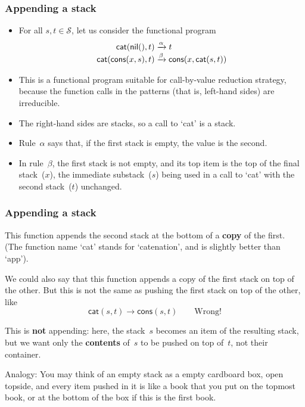 \documentclass[compress,dvipdfmx]{beamer}
\newcommand\fun[1]{\textsf{#1}}
\begin{document}
\begin{frame}
  \frametitle{Appending a stack}

  \begin{itemize}

    \item For all \(s, t \in \mathcal{S}\), let us consider the
      functional program
      \begin{align*}
        \fun{cat}(\fun{nil}(),t) &\xrightarrow{\alpha} t\\
        \fun{cat}(\fun{cons}(x,s),t) &\xrightarrow{\smash\beta}
        \fun{cons}(x,\fun{cat}(s,t))
      \end{align*}

    \item This is a functional program suitable for
      call\hyp{}by\hyp{}value reduction strategy, because the function
      calls in the patterns (that is, left\hyp{}hand sides) are
      irreducible.

    \item The right\hyp{}hand sides are stacks, so a call to
      `\fun{cat}' is a stack.

    \item Rule~\(\alpha\) says that, if the first stack is empty, the
      value is the second.

    \item In rule~\(\beta\), the first stack is not empty, and its top
      item is the top of the final stack~(\(x\)), the immediate
      substack~(\(s\)) being used in a call to `\fun{cat}' with the
      second stack~(\(t\)) unchanged.

  \end{itemize}

\end{frame}

\begin{frame}
  \frametitle{Appending a stack}

  This function appends the second stack at the bottom of a
  \textbf{copy} of the first. (The function name `\fun{cat}' stands
  for `catenation', and is slightly better than `\fun{app}').

  \bigskip

  We could also say that this function appends a copy of the first
  stack on top of the other. But this is not the same as pushing the
  first stack on top of the other, like
  \begin{equation*}
    \fun{cat}(s,t) \rightarrow \fun{cons}(s,t) \qquad
    \text{Wrong!}
  \end{equation*}

  This is \textbf{not} appending: here, the stack~\(s\) becomes an
  item of the resulting stack, but we want only the \textbf{contents}
  of~\(s\) to be pushed on top of~\(t\), not their container.

  \bigskip

  Analogy: You may think of an empty stack as a empty cardboard box,
  open topside, and every item pushed in it is like a book that you
  put on the topmost book, or at the bottom of the box if this is the
  first book.

\end{frame}
\end{document}

